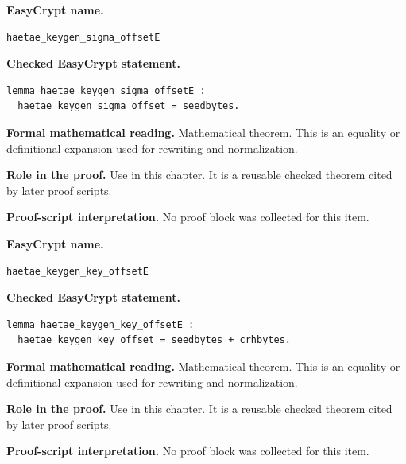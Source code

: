 \begin{formaltheorem}
\noindent\textbf{EasyCrypt name.}
\begin{lstlisting}[language=EasyCrypt,basicstyle=\ttfamily\scriptsize]
haetae_keygen_sigma_offsetE
\end{lstlisting}
\noindent\textbf{Checked EasyCrypt statement.}
\begin{lstlisting}[language=EasyCrypt,basicstyle=\ttfamily\scriptsize]
lemma haetae_keygen_sigma_offsetE :
  haetae_keygen_sigma_offset = seedbytes.
\end{lstlisting}
\noindent\textbf{Formal mathematical reading.}
Mathematical theorem. This is an equality or definitional expansion used for rewriting and normalization.

\noindent\textbf{Role in the proof.}
Use in this chapter. It is a reusable checked theorem cited by later proof scripts.

\noindent\textbf{Proof-script interpretation.}
No proof block was collected for this item.

\end{formaltheorem}

\begin{formaltheorem}
\noindent\textbf{EasyCrypt name.}
\begin{lstlisting}[language=EasyCrypt,basicstyle=\ttfamily\scriptsize]
haetae_keygen_key_offsetE
\end{lstlisting}
\noindent\textbf{Checked EasyCrypt statement.}
\begin{lstlisting}[language=EasyCrypt,basicstyle=\ttfamily\scriptsize]
lemma haetae_keygen_key_offsetE :
  haetae_keygen_key_offset = seedbytes + crhbytes.
\end{lstlisting}
\noindent\textbf{Formal mathematical reading.}
Mathematical theorem. This is an equality or definitional expansion used for rewriting and normalization.

\noindent\textbf{Role in the proof.}
Use in this chapter. It is a reusable checked theorem cited by later proof scripts.

\noindent\textbf{Proof-script interpretation.}
No proof block was collected for this item.

\end{formaltheorem}

